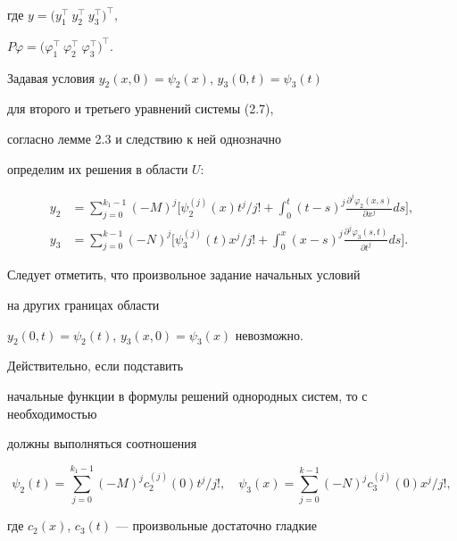где $y=\big(y_{1}^{\top} \ y_{2}^{\top} \ y_{3}^{\top}


\big)^{\top}$,


$P\varphi =\big(\varphi _{1}^{\top} \


\varphi _{2}^{\top} \ \varphi _{3}^{\top}\big)^{\top}$.





Задавая условия $y_2(x,0)=\psi _2(x)$, $y_3(0,t)=\psi _3(t)$


для второго и третьего уравнений системы (2.7), 


согласно лемме 2.3 и следствию к ней однозначно


определим их решения в области $U$:


\begin{align}


y_{2}&=\sum \limits _{j=0}^{k_1-1}


(-M)^{j}\bigg[\psi _2^{(j)}(x)t^{j}/j!+\int_{0}^t


(t-s)^j\frac{\partial ^j\varphi _2(x,s)}{\partial x^j}ds\bigg],\\


%


y_{3}&=\sum \limits_{j=0}^{k-1}


(-N)^{j}\bigg [\psi _3^{(j)}(t)x^{j}/j!+\int_{0}^x


(x-s)^j\frac{\partial ^j\varphi _3(s,t)}{\partial t^j}ds\bigg].


\end{align}


Следует отметить, что произвольное задание начальных условий


на других границах области


$y_2(0,t)=\psi _2(t)$, $y_3(x,0)=\psi _3(x)$ невозможно.


Действительно, если подставить


начальные функции в формулы решений однородных систем, то с необходимостью


должны выполняться соотношения


\begin{equation}


\psi _2(t)=\sum \limits _{j=0}^{k_1-1}(-M)^{j}c_2^{(j)}(0)t^{j}/j!,\quad


\psi _3(x)=\sum \limits _{j=0}^{k -1}(-N)^{j}c_3^{(j)}(0)x^{j}/j!,


\end{equation}


где $c_2(x)$, $c_3(t)$ --- произвольные достаточно гладкие


